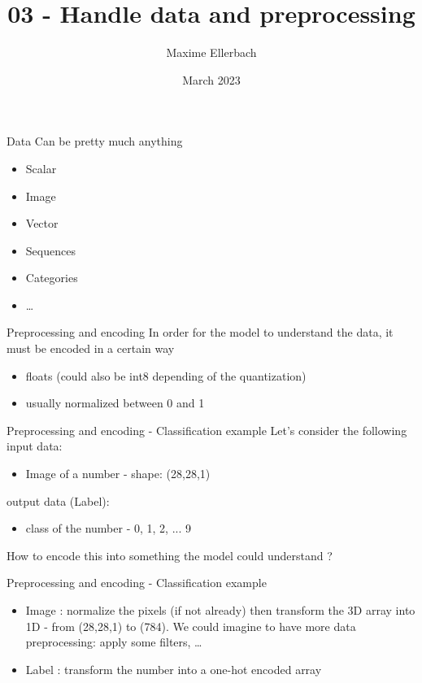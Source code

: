 \documentclass{beamer}
\title{03 - Handle data and preprocessing}
\author{Maxime Ellerbach}
\date{March 2023}
\begin{document}
\begin{frame}
    \titlepage
\end{frame}

\begin{frame}{Data}
    Can be pretty much anything
    \begin{itemize}
        \item Scalar
        \item Image
        \item Vector
        \item Sequences
        \item Categories
        \item \ldots
    \end{itemize}
\end{frame}

\begin{frame}{Preprocessing and encoding}
    In order for the model to understand the data, it must be encoded in a certain way
    \begin{itemize}
        \item floats (could also be int8 depending of the quantization)
        \item usually normalized between 0 and 1
    \end{itemize}
\end{frame}

\begin{frame}{Preprocessing and encoding - Classification example}
    Let's consider the following input data:
    \begin{itemize}
        \item Image of a number - shape: (28,28,1)
    \end{itemize}
    output data (Label):
    \begin{itemize}
        \item class of the number - 0, 1, 2, ... 9
    \end{itemize}
    
    How to encode this into something the model could understand ?
\end{frame}

\begin{frame}{Preprocessing and encoding - Classification example}
    \begin{itemize}
        \item Image : normalize the pixels (if not already) then transform the 3D array into 1D - from (28,28,1) to (784). We could imagine to have more data preprocessing: apply some filters, \ldots
        \item Label : transform the number into a one-hot encoded array
    \end{itemize}
    
\end{frame}
\end{document}
